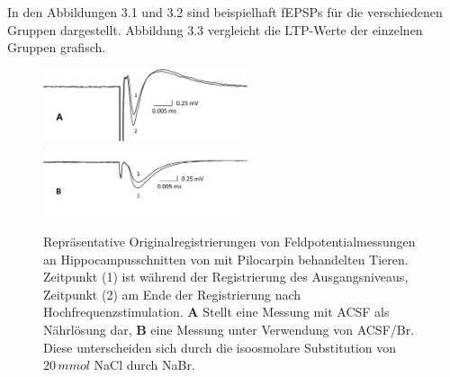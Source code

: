 \documentclass[a4paper,11pt]{report}
\begin{document}
{In den Abbildungen 3.1 und 3.2 sind beispielhaft fEPSPs für die verschiedenen Gruppen dargestellt. Abbildung 3.3 vergleicht die LTP-Werte der einzelnen Gruppen grafisch.



\begin{figure}
\begin{center}
\includegraphics[width=6cm]{Abbildungen/feld_samples/field_p_c}
\includegraphics[width=6cm]{Abbildungen/feld_samples/field_p_br}
\caption{Repräsentative Originalregistrierungen von Feldpotentialmessungen an Hippocampusschnitten von mit Pilocarpin behandelten Tieren. Zeitpunkt (1) ist während der Registrierung des Ausgangsniveaus, Zeitpunkt (2) am Ende der Registrierung nach Hochfrequenzstimulation. \textbf{A} Stellt eine Messung mit  ACSF als Nährlösung dar, \textbf{B} eine Messung unter Verwendung von ACSF/Br. Diese unterscheiden sich durch die isoosmolare Substitution von $20\, mmol$ NaCl durch NaBr.}
\end{center}
\end{figure}

}
\end{document}
